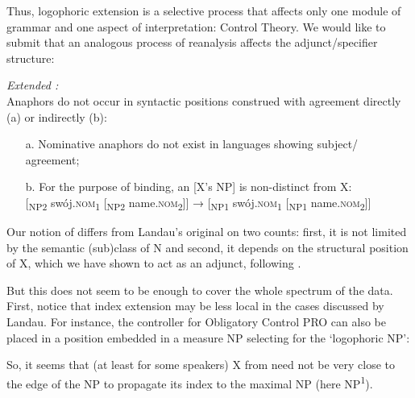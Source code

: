 \documentclass[output=paper,nonflat,colorlinks,citecolor=brown,newtxmath]{langsci/langscibook}
\begin{document}
\noindent Thus, logophoric extension is a selective process that affects only one module of grammar and one aspect of interpretation: Control Theory. We would like to submit that an analogous process of reanalysis affects the adjunct/specifier structure:

\ea \label{ex:witkos:63}
\textit{Extended :}\\
Anaphors do not occur in syntactic positions construed with agreement directly (a) or indirectly (b):\\
\begin{itemize}
    \item[a.] Nominative anaphors do not exist in languages showing subject/ agreement;\\
    \item[b.] For the purpose of binding, an  [X’s NP] is non-distinct from X:\\
    $[$\textsubscript{NP2} swój.\textsc{nom}\textsubscript{1} [\textsubscript{NP2} name.\textsc{nom}\textsubscript{2}$]]$ → [\textsubscript{NP1} swój.\textsc{nom}\textsubscript{1} [\textsubscript{NP1} name.\textsc{nom}\textsubscript{2}$]]$\\
\end{itemize}
\z

\noindent Our notion of  differs from Landau’s original on two counts: first, it is not limited by the semantic (sub)class of N and second, it depends on the structural position of X, which we have shown to act as an adjunct, following \cite{despic2011,despic2013,despic2015}.

But this does not seem to be enough to cover the whole spectrum of the data. First, notice that index extension may be less local in the cases discussed by Landau. For instance, the controller for Obligatory Control PRO can also be placed in a position embedded in a measure NP selecting for the ‘logophoric NP’:

\z

\noindent So, it seems that (at least for some speakers) X from  need not be very close to the edge of the NP to propagate its index to the maximal NP (here NP\textsuperscript{1}).
\end{document}
